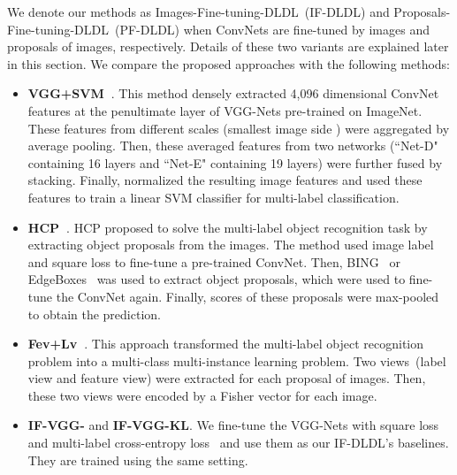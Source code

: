 \documentclass[journal]{IEEEtran}
\begin{document}
We denote our methods as Images-Fine-tuning-DLDL~(IF-DLDL) and Proposals-Fine-tuning-DLDL~(PF-DLDL) when ConvNets are fine-tuned by images and proposals of images, respectively. Details of these two variants are explained later in this section. We compare the proposed approaches with the following methods:
\begin{itemize}
\item \textbf{VGG+SVM~\cite{simonyan2015very}}. This method densely extracted 4,096 dimensional ConvNet features at the penultimate layer of VGG-Nets pre-trained on ImageNet. These features from different scales (smallest image side ) were aggregated by average pooling. Then, these averaged features from two networks (``Net-D" containing 16 layers and ``Net-E" containing 19 layers) were further fused by stacking. Finally, \cite{simonyan2015very}  normalized the resulting image features and used these features to train a linear SVM classifier for multi-label classification.

\item \textbf{HCP~\cite{wei2014cnn}}. HCP proposed to solve the multi-label object recognition task by extracting object proposals from the images. The method used image label and square loss to fine-tune a pre-trained ConvNet. Then, BING~\cite{cheng2014bing} or EdgeBoxes~\cite{zitnick2014edge} was used to extract object proposals, which were used to fine-tune the ConvNet again. Finally, scores of these proposals were max-pooled to obtain the prediction. 

\item \textbf{Fev+Lv~\cite{yang2016exp}}. This approach transformed the multi-label object recognition problem into a multi-class multi-instance learning problem. Two views~(label view and feature view) were extracted for each proposal of images. Then, these two views were encoded by a Fisher vector for each image.

\item \textbf{IF-VGG-} and \textbf{IF-VGG-KL}. We fine-tune the VGG-Nets with square loss and multi-label cross-entropy loss~\cite{gong2013deep} and use them as our IF-DLDL's baselines. They are trained using the same setting.
\end{itemize}
\end{document}
